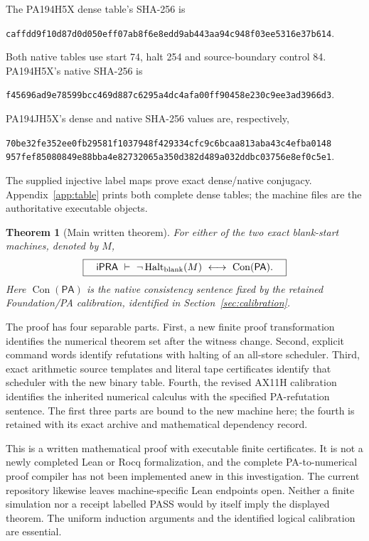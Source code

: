 \documentclass[11pt]{article}
\newtheorem{theorem}{Theorem}[section]
\newcommand{\ipra}{\mathsf{iPRA}}
\newcommand{\PA}{\mathsf{PA}}
\newcommand{\Con}{\operatorname{Con}}
\newcommand{\Halt}{\operatorname{Halt}}
\begin{document}
The PA194H5X dense table's SHA-256 is
\begin{center}\small
\nolinkurl{caffdd9f10d87d0d050eff07ab8f6e8edd9ab443aa94c948f03ee5316e37b614}.
\end{center}
Both native tables use start 74, halt 254 and source-boundary control 84.
PA194H5X's native SHA-256 is
\begin{center}\small
\nolinkurl{f45696ad9e78599bcc469d887c6295a4dc4afa00ff90458e230c9ee3ad3966d3}.
\end{center}
PA194JH5X's dense and native SHA-256 values are, respectively,
\begin{center}\small
\nolinkurl{70be32fe352ee0fb29581f1037948f429334cfc9c6bcaa813aba43c4efba0148}\\[2pt]
\nolinkurl{957fef85080849e88bba4e82732065a350d382d489a032ddbc03756e8ef0c5e1}.
\end{center}
The supplied injective label maps prove exact dense/native conjugacy.
Appendix~\ref{app:table} prints both complete dense tables; the machine
files are the authoritative executable objects.

\begin{theorem}[Main written theorem]
For either of the two exact blank-start machines, denoted by $M$,
\[
 \boxed{\quad\ipra\ \vdash\
  \neg\Halt_{\rm blank}(M)
       \ \longleftrightarrow\ \Con(\PA).\quad}
\]
Here $\Con(\PA)$ is the native consistency sentence fixed by the retained
Foundation/PA calibration, identified in Section~\ref{sec:calibration}.
\end{theorem}

The proof has four separable parts.  First, a new finite proof
transformation identifies the numerical theorem set after the witness
change.  Second, explicit command words identify refutations with halting
of an all-store scheduler.  Third, exact arithmetic source templates and
literal tape certificates identify that scheduler with the new binary
table.  Fourth, the revised AX11H calibration identifies the inherited
numerical calculus with the specified PA-refutation sentence.  The first
three parts are bound to the new machine here; the fourth is retained
with its exact archive and mathematical dependency record.

This is a written mathematical proof with executable finite certificates.
It is not a newly completed Lean or Rocq formalization, and the complete
PA-to-numerical proof compiler has not been implemented anew in this
investigation.  The current repository likewise leaves machine-specific
Lean endpoints open.  Neither a finite simulation nor a receipt labelled
PASS would by itself imply the displayed theorem.  The uniform induction
arguments and the identified logical calibration are essential.
\end{document}
